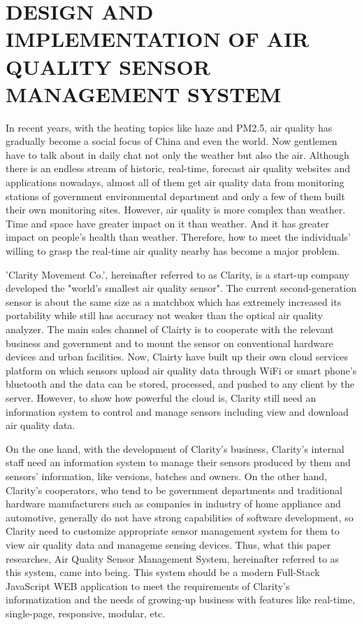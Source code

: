 \begingroup
\fontsize{10pt}{12pt}\selectfont
\chapter{DESIGN AND IMPLEMENTATION OF AIR QUALITY SENSOR MANAGEMENT SYSTEM}
\endgroup

In recent years, with the heating topics like haze and PM2.5, air quality has gradually become a social focus of China and even the world. Now gentlemen have to talk about in daily chat not only the weather but also the air. Although there is an endless stream of historic, real-time, forecast air quality websites and applications nowadays, almost all of them get air quality data from monitoring stations of government environmental department and only a few of them built their own monitoring sites. However, air quality is more complex than weather. Time and space have greater impact on it than weather. And it has greater impact on people's health than weather. Therefore, how to meet the individuals' willing to grasp the real-time air quality nearby has become a major problem.

'Clarity Movement Co.', hereinafter referred to as Clarity, is a start-up company developed the "world's smallest air quality sensor". The current second-generation sensor is about the same size as a matchbox which has extremely increased its portability while still has accuracy not weaker than the optical air quality analyzer. The main sales channel of Clairty is to cooperate with the relevant business and government and to mount the sensor on conventional hardware devices and urban facilities. Now, Clairty have built up their own cloud services platform on which sensors upload air quality data through WiFi or smart phone's bluetooth and the data can be stored, processed, and pushed to any client by the server. However, to show how powerful the cloud is, Clarity still need an information system to control and manage sensors including view and download air quality data.

On the one hand, with the development of Clarity's business, Clarity's internal staff need an information system to manage their sensors produced by them and sensors' information, like versions, batches and owners. On the other hand, Clarity's cooperators, who tend to be government departments and traditional hardware manufacturers such as companies in industry of home appliance and automotive, generally do not have strong capabilities of software development, so Clarity need to customize appropriate sensor management system for them to view air quality data and manageme sensing devices. Thus, what this paper researches, Air Quality Sensor Management System, hereinafter referred to as this system, came into being. This system should be a modern Full-Stack JavaScript WEB application to meet the requirements of Clarity's informatization and the needs of growing-up business with features like real-time, single-page, responsive, modular, etc.

